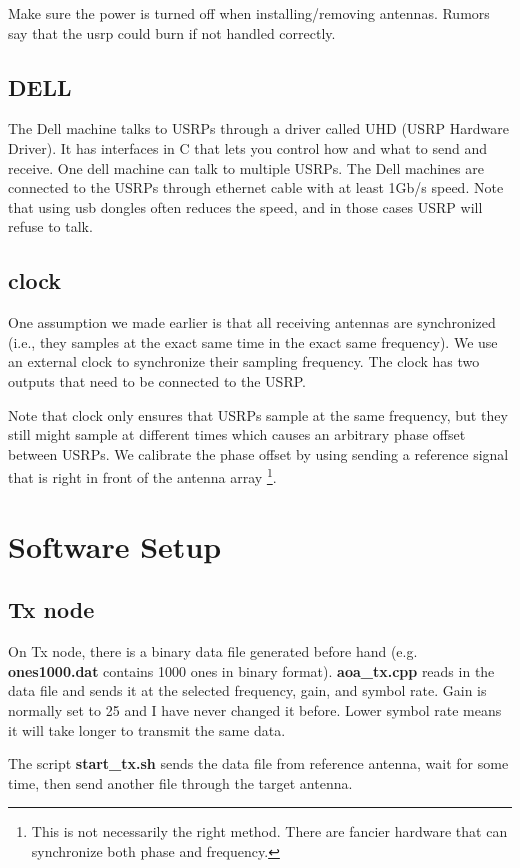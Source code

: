 \documentclass[10pt]{article}
\begin{document}
Make sure the power is turned off when installing/removing antennas.  Rumors say that the usrp could burn if not handled correctly.



\subsection{DELL}
The Dell machine talks to USRPs through a driver called UHD (USRP Hardware Driver).  It has interfaces in C that lets you control how and what to send and receive.  One dell machine can talk to multiple USRPs.  The Dell machines are connected to the USRPs through ethernet cable with at least 1Gb/s speed.  Note that using usb dongles often reduces the speed, and in those cases USRP will refuse to talk.


\subsection{clock}
One assumption we made earlier is that all receiving antennas are synchronized (i.e., they samples at the exact same time in the exact same frequency).  We use an external clock to synchronize their sampling frequency.  The clock has 
two outputs that need to be connected to the USRP.  

Note that clock only ensures that USRPs sample at the same frequency, but they still might sample at different times which causes an arbitrary phase offset between USRPs.  We calibrate the phase offset by using sending a reference signal that is right in front of the antenna array \footnote{This is not necessarily the right method.  There are fancier hardware that can synchronize both phase and frequency.}.


\section{Software Setup}
\subsection{Tx node}
On Tx node, there is a binary data file generated before hand (e.g. \textbf{ones1000.dat} contains 1000 ones in binary format).  \textbf{aoa\_tx.cpp} reads in the data file and sends it at the selected frequency, gain, and symbol rate.  Gain is normally set to 25 and I have never changed it before.  Lower symbol rate means it will take longer to transmit the same data.

The script \textbf{start\_tx.sh} sends the data file from reference antenna, wait for some time, then send another file through the target antenna.
\end{document}
